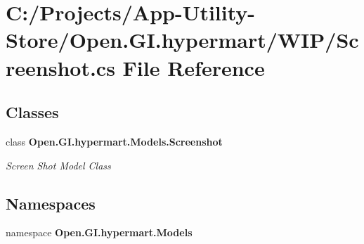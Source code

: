 \section{C\+:/\+Projects/\+App-\/\+Utility-\/\+Store/\+Open.G\+I.\+hypermart/\+W\+I\+P/\+Screenshot.cs File Reference}
\label{_w_i_p_2_screenshot_8cs}
\subsection*{Classes}
\begin{DoxyCompactItemize}
\item 
class \textbf{ Open.\+G\+I.\+hypermart.\+Models.\+Screenshot}
\begin{DoxyCompactList}\small\item\em Screen Shot Model Class \end{DoxyCompactList}\end{DoxyCompactItemize}
\subsection*{Namespaces}
\begin{DoxyCompactItemize}
\item 
namespace \textbf{ Open.\+G\+I.\+hypermart.\+Models}
\end{DoxyCompactItemize}
